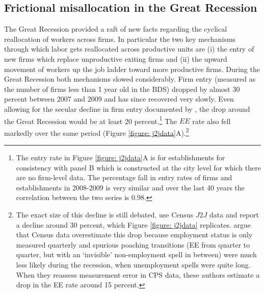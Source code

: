 \subsection{Frictional misallocation in the Great Recession}\label{sec:applications}

The Great Recession provided a raft of new facts regarding the cyclical reallocation of workers across firms.
In particular the two key mechanisms through which labor gets reallocated across productive units are
(i) the entry of new firms which replace unproductive exiting firms and
(ii) the upward movement of workers up the job ladder toward more productive firms.
During the Great Recession both mechanisms slowed considerably.
Firm entry (measured as the number of firms less than 1 year old in the BDS) dropped by almost 30 percent between 2007 and 2009 and has since recovered very slowly. Even allowing for the secular decline in firm entry documented by \citet{pugsley2019grown}, the drop around the Great Recession would be at least 20 percent.\footnote{The entry rate in Figure \ref{figure: j2jdata}A is for establishments for consistency with panel B which is constructed at the city level for which there are no firm-level data. The percentage fall in entry rates of firms and establishments in 2008-2009 is very similar and over the last 40 years the correlation between the two series is 0.98.} The $EE$ rate also fell markedly over the same period (Figure \ref{figure: j2jdata}A).\footnote{
    The exact size of this decline is still debated.
    \citet{HHKM2018} use Census $J2J$ data and report a decline around 30 percent, which Figure \ref{figure: j2jdata} replicates.
    \citet{fujitameasuring2019} argue that Census data overestimate this drop because employment status is only measured quarterly and spurious
poaching transitions (EE from quarter to quarter, but with an `invisible' non-employment spell in between) were much less likely during the
recession, when unemployment spells were quite long.
When they reassess measurement error in CPS data, these authors estimate a drop in the EE rate around 15 percent.}

